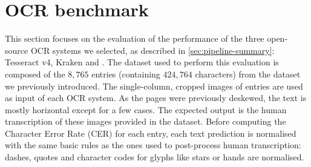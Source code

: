 \section{OCR benchmark}
\label{sec:ocr-xp}

This section focuses on the evaluation of the performance of the three open-source OCR systems we selected, as described in \cref{sec:pipeline-summary}: Tesseract v4, Kraken and \peroocr.
The dataset used to perform this evaluation is composed of the $8,765$ entries (containing $424,764$ characters) from the dataset we previously introduced.
The single-column, cropped images of entries are used as input of each OCR system.
As the pages were previously deskewed, the text is mostly horizontal except for a few cases.
The expected output is the human transcription of these images provided in the dataset.
Before computing the Character Error Rate (CER) for each entry, each text prediction is normalised with the same basic rules as the ones used to post-process human transcription: dashes, quotes and character codes for glyphs like stars or hands are normalised.



